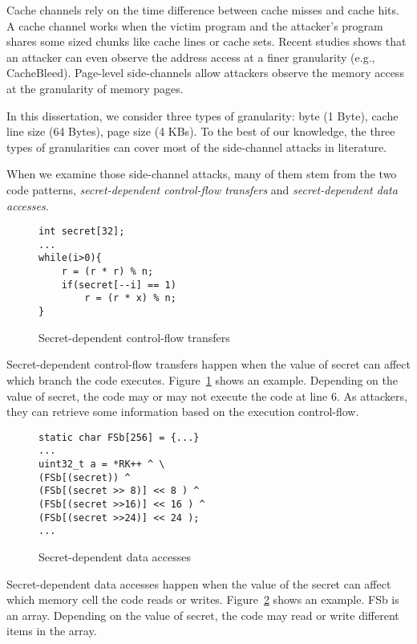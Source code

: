Cache channels rely on the time difference between cache misses and cache hits. A cache channel works when the victim program and the attacker's program shares some sized chunks like cache lines or cache sets. Recent studies shows that an attacker can even observe the address access at a finer granularity (e.g., CacheBleed). Page-level side-channels allow attackers observe the memory access at the granularity of memory pages. 

In this dissertation, we consider three types of granularity: byte (1 Byte), cache line size (64 Bytes), page size (4 KBs). To the best of our knowledge, the three types of granularities can cover most of the side-channel attacks in literature.

When we examine those side-channel attacks, many of them stem from the two code patterns, \emph{secret-dependent control-flow transfers} and \emph{secret-dependent data accesses}.
\begin{figure}[h]
\begin{lstlisting}[xleftmargin=.32\textwidth, xrightmargin=.32\textwidth]
int secret[32];
...
while(i>0){
    r = (r * r) % n;
    if(secret[--i] == 1)
        r = (r * x) % n;   
}
\end{lstlisting}
\caption{Secret-dependent control-flow transfers}
\label{fig:secret:cf}
\end{figure}

Secret-dependent control-flow transfers happen when the value of secret can affect which branch the code executes. Figure~\ref{fig:secret:cf} shows an example. Depending on the value of \textsf{secret}, the code may or may not execute the code at line 6. As attackers, they can retrieve some information based on the execution control-flow. 

\begin{figure}[h]
\begin{lstlisting}[xleftmargin=.32\textwidth, xrightmargin=.32\textwidth]
static char FSb[256] = {...}
... 
uint32_t a = *RK++ ^ \ 
(FSb[(secret)) ^
(FSb[(secret >> 8)] << 8 ) ^
(FSb[(secret >>16)] << 16 ) ^
(FSb[(secret >>24)] << 24 );
...
\end{lstlisting}
\caption{Secret-dependent data accesses}
\label{fig:secret:da}
\end{figure}

Secret-dependent data accesses happen when the value of the secret can affect which memory cell the code reads or writes. Figure~\ref{fig:secret:da} shows an example. \textsf{FSb} is an array. Depending on the value of \textsf{secret}, the code may read or write different items in the array. 


